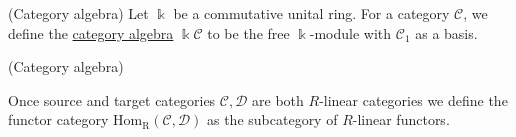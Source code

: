 \begin{definition}{(Category algebra)}
Let $\Bbbk$ be a commutative unital ring. For a category $\mathcal{C}$, we define the \ul{category algebra} $\Bbbk \mathcal{C}$
to be the free $\Bbbk$-module with $\mathcal{C}_{1}$ as a basis. 
\end{definition}

\begin{definition}{(Category algebra)}

\end{definition}

\begin{definition}
Once source and target categories $\mathcal{C}, \mathcal{D}$ are both $R$-linear categories we define the functor category
$\mathrm{Hom_{R}}(\mathcal{C},\mathcal{D})$ as the subcategory of $R$-linear functors.
\end{definition}




